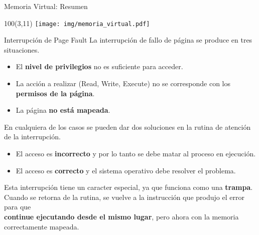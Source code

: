 \documentclass[aspectratio=169]{beamer}
\begin{document}
\begin{frame}[t]{Memoria Virtual: Resumen}
    \begin{textblock}{100}(3,11)
    \texttt{[image: img/memoria\_virtual.pdf]}
    \end{textblock}
\end{frame}

\begin{frame}{Interrupción de Page Fault}
    \small
    La interrupción de fallo de página se produce en tres situaciones.
    \begin{itemize}
     \item El \textcolor{verdeuca}{\textbf{nivel de privilegios}} no es suficiente para acceder.
     \item La acción a realizar {\footnotesize(Read, Write, Execute)} no se corresponde con los \textcolor{verdeuca}{\textbf{permisos de la página}}.
     \item La página \textcolor{verdeuca}{\textbf{no está mapeada}}.
    \end{itemize}
    \pause
    \bigskip
    En cualquiera de los casos se pueden dar dos soluciones en la rutina de atención de la interrupción.
    \begin{itemize}
     \item El acceso es \textbf{incorrecto} y por lo tanto se debe matar al proceso en ejecución.
     \item El acceso es \textbf{correcto} y el sistema operativo debe resolver el problema.
    \end{itemize}
    \pause
    \bigskip
    Esta interrupción tiene un caracter especial, ya que funciona como una \textbf{trampa}.\\
    \medskip
    \textcolor{verdeuca}{Cuando se retorna de la rutina, se vuelve a la instrucción que produjo el error para que\\
    \textbf{continue ejecutando desde el mismo lugar}, pero ahora con la memoria correctamente mapeada.}
\end{frame}
\end{document}
